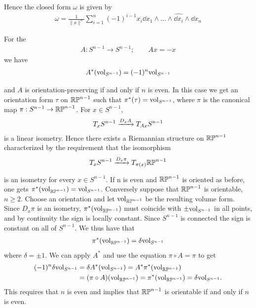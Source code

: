 \begin{example}
  Hence the closed form $\omega$ is given by 
  \begin{align}\label{eq:9-19}
    \omega = \frac{1}{\|x\|^n} \sum_{i=1}^{n }{
      (-1)^{i-1}x_i \dd x_1\wedge\ldots\wedge\widehat{\dd x_i}\wedge\dd x_n
    }
  \end{align}
\end{example}

\begin{example}\label{example:9-19}
  For the  
  \begin{align*}
    A:S^{n-1} \to S^{n-1}; \qquad Ax = -x 
  \end{align*}
  we have 
  \begin{align*}
    A^*(\mathrm{vol}_{S^{n-1}}) = (-1)^n \mathrm{vol}_{S^{n-1}}
  \end{align*}

  and $A$ is orientation-preserving if and only if $n$ is even. In this case we get an
  orientation form $\tau$ on $\mathbb{RP}^{n-1}$ such that $\pi^*(\tau) = \mathrm{vol}_{S^{n-1}}$,
  where $\pi$ is the canonical map $\pi:S^{n-1}\to\mathbb{RP}^{n-1}$. For $x\in S^{n-1}$,
  \begin{align*}
    T_xS^{n-1} \xra[D_xA] T_{Ax} S^{n-1}
  \end{align*}
  is a linear isometry. Hence there exists a Riemannian structure on $\mathbb{RP}^{n-1}$
  characterized by the requirement that the isomorphism
  \begin{align*}
    T_xS^{n-1} \xra[D_x\pi] T_{\pi (x)} \B{RP}^{n-1}
  \end{align*}

  is an isometry for every $x\in S^{n-1}$. If n is even and $\mathbb{RP}^{n-1}$ is oriented as before,
  one gets $\pi^*(\mathrm{vol}_{\mathbb{RP}^{n-1}}) = \mathrm{vol}_{S^{n-1}}$. Conversely suppose that $\mathbb{RP}^{n-1}$ 
  is orientable, $n\ge 2$. Choose an orientation and let $\mathrm{vol}_{\mathbb{RP}^{n-1}}$ be the resulting volume form. Since
  $D_x\pi$ is an isometry, $\pi^*(\mathrm{vol}_{\mathbb{RP}^{n-1}})$ must coincide with $\pm\mathrm{vol}_{S^{n-1}}$ in all points, 
  and by continuity the sign is locally constant. Since $S^{n-1}$ is connected the sign is
  constant on all of $S^{n-1}$. We thus have that
  \begin{align*}
    \pi^*(\mathrm{vol}_{\mathbb{RP}^{n-1}})
    = \delta\mathrm{vol}_{S^{n-1}}
  \end{align*}
  where $\delta=\pm 1$. We can apply $A^*$ and use the equation $\pi\circ A =\pi$ to get 
  \begin{align*}
    (-1)^n \delta\mathrm{vol}_{S^{n-1}} 
    & = \delta A^*(\mathrm{vol}_{S^{n-1}})
        = A^*\pi^*(\mathrm{vol}_{\mathbb{RP}^{n-1}}) \\
    & = (\pi\circ A)(\mathrm{vol}_{\mathbb{RP}^{n-1}}) 
        = \pi^*(\mathrm{vol}_{\mathbb{RP}^{n-1}}) 
        = \delta \mathrm{vol}_{S^{n-1}}.
  \end{align*}
  This requires that $n$ is even and implies that $\mathbb{RP}^{n-1}$ is orientable if and only if
  $n$ is even.
\end{example}


